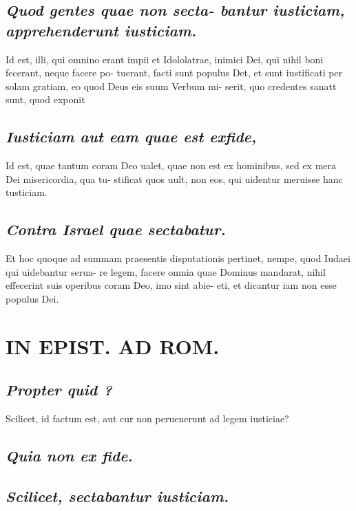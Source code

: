 \documentclass{article}
\begin{document}
\begin{pages}
\subsection*{\textit{Quod gentes quae non secta- bantur iusticiam, apprehenderunt iusticiam. }}\pstart Id est, illi, qui omnino erant impii et Idololatrae, inimici Dei, qui nihil boni fecerant, neque facere po- tuerant, facti sunt populus Det, et sunt iustificati per solam gratiam, eo quod Deus eis suum Verbum mi- serit, quo credentes sanatt sunt, quod exponit  \pend
{}
{}
\subsection*{\textit{Iusticiam aut eam quae est exfide, }}\pstart Id est, quae tantum coram Deo ualet, quae non est ex hominibus, sed ex mera Dei misericordia, qua tu- stificat quos uult, non eos, qui uidentur meruisse hanc tusticiam.   \pend
{}
{}
\subsection*{\textit{Contra Israel quae sectabatur. }}\pstart Et hoc quoque ad summam praesentis disputationis pertinet, nempe, quod Iudaei qui uidebantur serua- re legem, facere omnia quae Dominus mandarat, nihil effecerint suis operibus coram Deo, imo sint abie- eti, et dicantur iam non esse populus Dei.   \pend
\section*{IN EPIST. AD ROM.  }
\marginpar{[ p.116 ]}
{}
\subsection*{\textit{Propter quid ? }}\pstart Scilicet, id factum est, aut cur non peruenerunt ad legem iusticiae?  \pend
{}
{}
\subsection*{\textit{Quia non ex fide. }}
{}
\subsection*{\textit{Scilicet, sectabantur iusticiam.  }}
{}

\end{pages}
\end{document}
